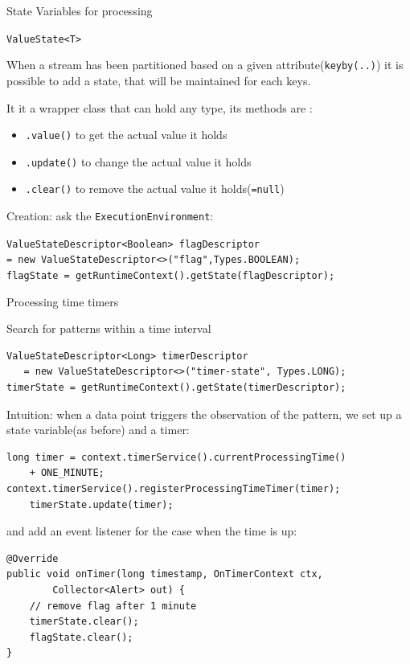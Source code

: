\documentclass[blue]{beamer}
\begin{document}
\begin{frame}{State Variables for processing}

{\tt  ValueState<T>} 

When a stream has been partitioned based on a given attribute({\tt keyby(..)}) it is possible to add a state, that will be maintained for each keys.

It it a wrapper class that can hold any type, its methods are :
\begin{itemize}
    \item {\tt .value()} to get the actual value it holds
    \item {\tt .update()} to change the actual value it holds
    \item {\tt .clear()} to remove the actual value it holds(\texttt{=null})
    
\end{itemize}
Creation: ask the \texttt{ExecutionEnvironment}:
\small{
\texttt{ValueStateDescriptor<Boolean> flagDescriptor \\
= new ValueStateDescriptor<>("flag",Types.BOOLEAN);\\
flagState = getRuntimeContext().getState(flagDescriptor);}

}
    
\end{frame}

\begin{frame}[fragile]{Processing time timers}

Search for patterns within a time interval
\small{
\begin{lstlisting}
ValueStateDescriptor<Long> timerDescriptor 
   = new ValueStateDescriptor<>("timer-state", Types.LONG);
timerState = getRuntimeContext().getState(timerDescriptor);
\end{lstlisting}

Intuition: when a data point  triggers the observation of the pattern, we set up a state variable(as before) and a timer:
\begin{lstlisting}
long timer = context.timerService().currentProcessingTime()
    + ONE_MINUTE;
context.timerService().registerProcessingTimeTimer(timer);
    timerState.update(timer);
\end{lstlisting}
and add an event listener for the case when the time is up:
\begin{lstlisting}
@Override
public void onTimer(long timestamp, OnTimerContext ctx,
        Collector<Alert> out) {
    // remove flag after 1 minute
    timerState.clear();
    flagState.clear();
}
\end{lstlisting}
}


\end{frame}
\end{document}
